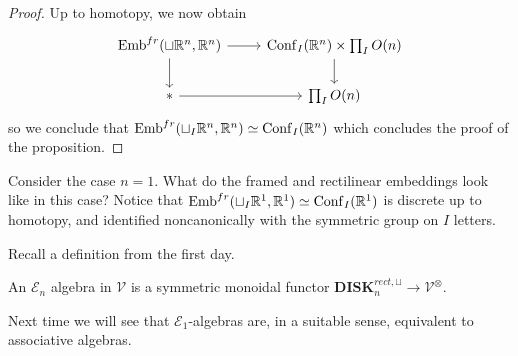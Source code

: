 \documentclass{amsart}
\DeclareMathOperator{\Emb}{Emb}
\DeclareMathOperator{\Conf}{Conf}
\begin{document}
\begin{proof}
    Up to homotopy, we now obtain
    \begin{equation*}
        \begin{tikzcd}
            \Emb^{fr}(\sqcup\R^n,\R^n) \rar\dar & \Conf_I(\R^n)\times \prod_I O(n)\dar \\
            * \rar & \prod_I O(n)
        \end{tikzcd}
    \end{equation*}
    so we conclude that $\Emb^{fr}(\sqcup_I\R^n,\R^n)\simeq \Conf_I(\R^n)$ which concludes
    the proof of the proposition.
\end{proof}

\begin{example}
    Consider the case $n=1$. What do the framed and rectilinear embeddings look like in this case?
    Notice that $\Emb^{fr}(\sqcup_I \R^1,\R^1)\simeq \Conf_I(\R^1)$ is discrete up to
    homotopy, and identified noncanonically with the symmetric group on $I$ letters.
\end{example}

Recall a definition from the first day.
\begin{definition}
    An $\mathcal{E}_n$ algebra in $\mathcal{V}$ is a symmetric monoidal functor
    $\mathbf{DISK}_n^{rect,\sqcup} \to \mathcal{V}^\otimes$.
\end{definition}
Next time we will see that $\mathcal{E}_1$-algebras are, in a suitable sense,
equivalent to associative algebras.




\newpage




\end{document}
